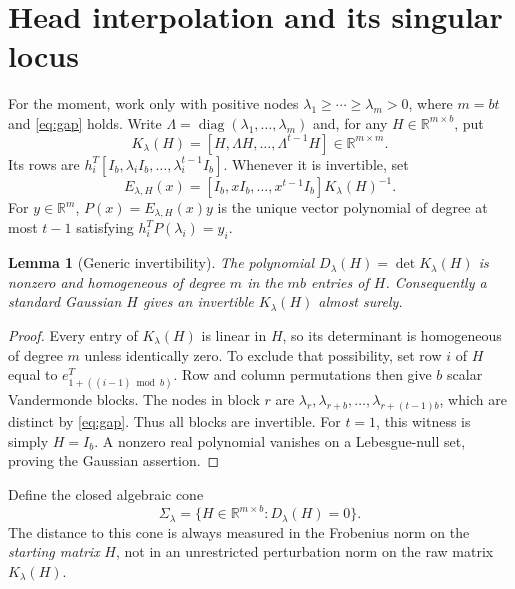 \documentclass[11pt]{article}
\numberwithin{equation}{section}
\newtheorem{lemma}[theorem]{Lemma}
\theoremstyle{definition}
\newcommand{\R}{\mathbb R}
\newcommand{\diag}{\operatorname{diag}}
\begin{document}
\section{Head interpolation and its singular locus}\label{sec:interpolation}
For the moment, work only with positive nodes
$\lambda_1\ge\cdots\ge\lambda_m>0$, where $m=bt$ and \eqref{eq:gap} holds. Write $\Lambda=\diag(\lambda_1,\ldots,\lambda_m)$ and, for any $H\in\R^{m\times b}$, put
\begin{equation}\label{eq:Khead}
K_\lambda(H)=[H,\Lambda H,\ldots,\Lambda^{t-1}H]\in\R^{m\times m}.
\end{equation}
Its rows are $h_i^T[I_b,\lambda_i I_b,\ldots,\lambda_i^{t-1}I_b]$.
Whenever it is invertible, set
\begin{equation}\label{eq:eval}
E_{\lambda,H}(x)=[I_b,xI_b,\ldots,x^{t-1}I_b]K_\lambda(H)^{-1}.
\end{equation}
For $y\in\R^m$, $P(x)=E_{\lambda,H}(x)y$ is the unique vector polynomial of degree at most $t-1$ satisfying $h_i^TP(\lambda_i)=y_i$.

\begin{lemma}[Generic invertibility]\label{lem:generic}
The polynomial $D_\lambda(H)=\det K_\lambda(H)$ is nonzero and homogeneous of degree $m$ in the $mb$ entries of $H$. Consequently a standard Gaussian $H$ gives an invertible $K_\lambda(H)$ almost surely.
\end{lemma}
\begin{proof}
Every entry of $K_\lambda(H)$ is linear in $H$, so its determinant is homogeneous of degree $m$ unless identically zero. To exclude that possibility, set row $i$ of $H$ equal to $e_{1+((i-1)\bmod b)}^T$. Row and column permutations then give $b$ scalar Vandermonde blocks. The nodes in block $r$ are
$\lambda_r,\lambda_{r+b},\ldots,\lambda_{r+(t-1)b}$, which are distinct by \eqref{eq:gap}. Thus all blocks are invertible. For $t=1$, this witness is simply $H=I_b$.
A nonzero real polynomial vanishes on a Lebesgue-null set, proving the Gaussian assertion.
\end{proof}

Define the closed algebraic cone
\begin{equation}\label{eq:sigma}
\Sigma_\lambda=\{H\in\R^{m\times b}:D_\lambda(H)=0\}.
\end{equation}
The distance to this cone is always measured in the Frobenius norm on the \emph{starting matrix} $H$, not in an unrestricted perturbation norm on the raw matrix $K_\lambda(H)$.
\end{document}
